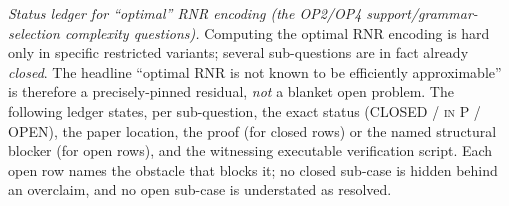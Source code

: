 \documentclass[
]{article}
\begin{document}
\emph{Status ledger for ``optimal'' RNR encoding (the OP2/OP4
support/grammar-selection complexity questions).} Computing the optimal
RNR encoding is hard only in specific restricted variants; several
sub-questions are in fact already \emph{closed}. The headline ``optimal
RNR is not known to be efficiently approximable'' is therefore a
precisely-pinned residual, \emph{not} a blanket open problem. The
following ledger states, per sub-question, the exact status (CLOSED /
\textsc{in P} / OPEN), the paper location, the proof (for closed rows)
or the named structural blocker (for open rows), and the witnessing
executable verification script. Each open row names the obstacle that
blocks it; no closed sub-case is hidden behind an overclaim, and no open
sub-case is understated as resolved.

\begingroup\footnotesize\sloppy
\setlength{\tabcolsep}{4pt}
\end{document}
